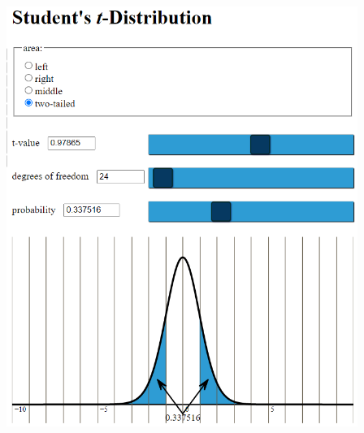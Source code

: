 \begin{enumerate}
\begin{mybox}
            \noindent \begin{center}\includegraphics[width=4.5in]{p42.PNG}
            \end{center}

            
    \end{mybox}
\end{enumerate}